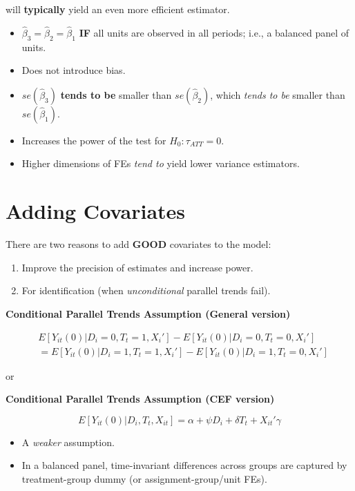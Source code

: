 \documentclass[
  letterpaper,
  DIV=11,
  numbers=noendperiod]{scrreprt}
\providecommand{\tightlist}{%
  \setlength{\itemsep}{0pt}\setlength{\parskip}{0pt}}\usepackage{longtable,booktabs,array}
\theoremstyle{definition}
\theoremstyle{remark}
\begin{document}
\begin{enumerate}
  will \textbf{typically} yield an even more efficient estimator.

  \begin{itemize}
  \tightlist
  \item
    \(\hat{\beta}_3=\hat{\beta}_2=\hat{\beta}_1\) \textbf{IF} all units
    are observed in all periods; i.e., a balanced panel of units.
  \item
    Does not introduce bias.
  \item
    \(se(\hat{\beta}_3)\) \textbf{tends to be} smaller than
    \(se(\hat{\beta}_2)\), which \emph{tends to be} smaller than
    \(se(\hat{\beta}_1)\).
  \item
    Increases the power of the test for \(H_0: \tau_{ATT}=0\).
  \item
    Higher dimensions of FEs \emph{tend to} yield lower variance
    estimators.
  \end{itemize}

  \section{Adding Covariates}\label{adding-covariates-2}

  There are two reasons to add \textbf{GOOD} covariates to the model:

  \begin{enumerate}
  \def\labelenumii{\arabic{enumii}.}
  \tightlist
  \item
    Improve the precision of estimates and increase power.
  \item
    For identification (when \emph{unconditional} parallel trends fail).
  \end{enumerate}

  \textbf{Conditional Parallel Trends Assumption (General version)}

  \[
  \begin{aligned}
  &E[Y_{it}(0)|D_i=0,T_t=1,X_i'] - E[Y_{it}(0)|D_i=0,T_t=0,X_i'] \\
  &= E[Y_{it}(0)|D_i=1,T_t=1,X_i'] - E[Y_{it}(0)|D_i=1,T_t=0,X_i']
  \end{aligned}
  \]

  or

  \textbf{Conditional Parallel Trends Assumption (CEF version)}

  \[
  E[Y_{it}(0)|D_i,T_t,X_{it}] = \alpha + \psi D_i + \delta T_t + X_{it}'\gamma
  \]

  \begin{itemize}
  \tightlist
  \item
    A \emph{weaker} assumption.
  \item
    In a balanced panel, time-invariant differences across groups are
    captured by treatment-group dummy (or assignment-group/unit FEs).
  \end{itemize}


\end{enumerate}
\end{document}

